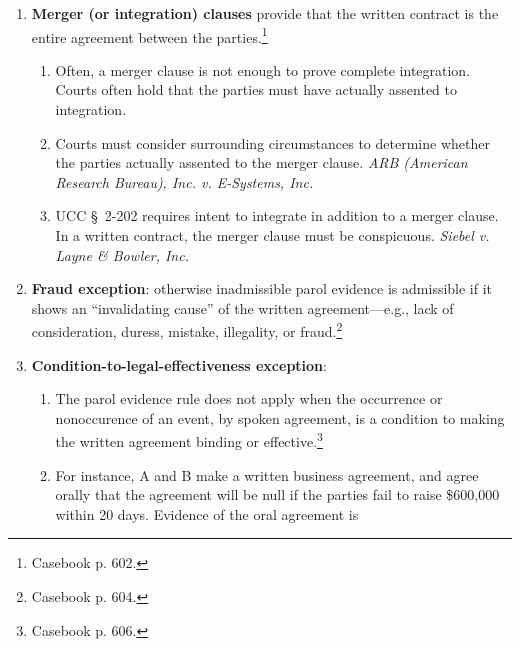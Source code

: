 \begin{enumerate}
{    Industries, Inc. v. Doliner}.
    \begin{enumerate}
        \item The \emph{Hunt Foods} view of consistency is too narrow. A 
        better definition is ``the absence of reasonable harmony in terms of 
        the language and respective obligations of the 
        parties.''\footnote{Casebook p. 601.} \emph{Alaska Northern 
        Development, Inc. v. Alyeska Pipeline Service Co.}
    \end{enumerate}
    \item \textbf{Merger (or integration) clauses} provide that the written 
    contract is the entire agreement between the parties.\footnote{Casebook p. 
    602.}
    \begin{enumerate}
        \item Often, a merger clause is not enough to prove complete 
        integration. Courts often hold that the parties must have actually 
        assented to integration.
        \item Courts must consider surrounding circumstances to determine 
        whether the parties actually assented to the merger clause. \emph{ARB 
        (American Research Bureau), Inc. v. E-Systems, Inc.}
        \item UCC \S\ 2-202 requires intent to integrate in addition to a 
        merger clause. In a written contract, the merger clause must be 
        conspicuous. \emph{Siebel v. Layne \& Bowler, Inc.}
    \end{enumerate}
    \item \textbf{Fraud exception}: otherwise inadmissible parol evidence is 
    admissible if it shows an ``invalidating cause'' of the written 
    agreement---e.g., lack of consideration, duress, mistake, illegality, or 
    fraud.\footnote{Casebook p. 604.}
    \item \textbf{Condition-to-legal-effectiveness exception}: 
    \begin{enumerate}
        \item The parol evidence rule does not apply when the occurrence or 
        nonoccurence of an event, by spoken agreement, is a condition to 
        making the written agreement binding or effective.\footnote{Casebook 
        p. 606.}
        \item For instance, A and B make a written business agreement, and 
        agree orally that the agreement will be null if the parties fail to 
        raise \$600,000 within 20 days. Evidence of the oral agreement is 

\end{enumerate}
\end{enumerate}
